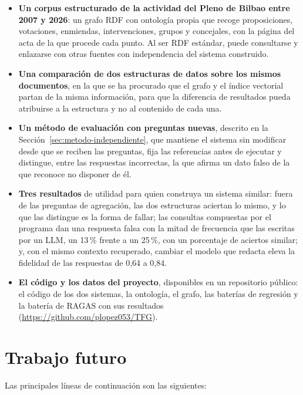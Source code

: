 \documentclass[11pt, a4paper]{report}
\begin{document}
	\begin{itemize}
		\item \textbf{Un corpus estructurado de la actividad del Pleno de Bilbao
		entre 2007 y 2026}: un grafo RDF con ontología propia que recoge
		proposiciones, votaciones, enmiendas, intervenciones, grupos y concejales,
		con la página del acta de la que procede cada punto. Al ser RDF estándar,
		puede consultarse y enlazarse con otras fuentes con independencia del
		sistema construido.
		\item \textbf{Una comparación de dos estructuras de datos sobre los mismos
		documentos}, en la que se ha procurado que el grafo y el índice vectorial
		partan de la misma información, para que la diferencia de resultados
		pueda atribuirse a la estructura y no al contenido de cada una.
		\item \textbf{Un método de evaluación con preguntas nuevas}, descrito en
		la Sección~\ref{sec:metodo-independiente}, que mantiene el sistema sin
		modificar desde que se reciben las preguntas, fija las referencias antes
		de ejecutar y distingue, entre las respuestas incorrectas, la que afirma
		un dato falso de la que reconoce no disponer de él.
		\item \textbf{Tres resultados} de utilidad para quien construya un sistema
		similar: fuera de las preguntas de agregación, las dos estructuras
		aciertan lo mismo, y lo que las distingue es la forma de fallar; las
		consultas compuestas por el programa dan una respuesta falsa con la
		mitad de frecuencia que las escritas por un LLM, un 13\,\% frente a un
		25\,\%, con un porcentaje de aciertos similar; y, con el mismo contexto
		recuperado, cambiar el modelo que redacta eleva la fidelidad de las
		respuestas de 0,64 a 0,84.
		\item \textbf{El código y los datos del proyecto}, disponibles en un
		repositorio público: el código de los dos sistemas, la ontología, el
		grafo, las baterías de regresión y la batería de RAGAS con sus
		resultados (\url{https://github.com/plopez053/TFG}).
	\end{itemize}

	\section{Trabajo futuro}
	\label{sec:trabajo-futuro}

	Las principales líneas de continuación son las siguientes:
\end{document}
